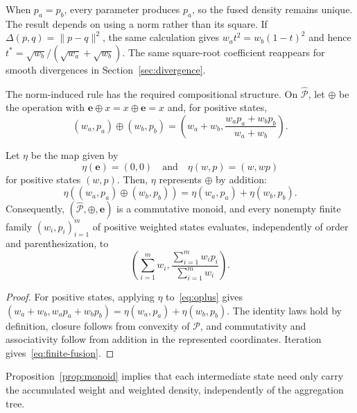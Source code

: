 \documentclass[runningheads]{llncs}
\newcommand{\Pcal}{\mathcal{P}}
\newcommand{\e}{\mathbf{e}}
\newcommand{\norm}[1]{\lVert #1\rVert}
\begin{document}
When $p_a=p_b$, every parameter produces $p_a$, so the fused density remains unique. The result depends on using a norm rather than its square. If $\Delta(p,q)=\norm{p-q}^2$, the same calculation gives $w_at^2=w_b(1-t)^2$ and hence $t^*=\sqrt{w_b}/(\sqrt{w_a}+\sqrt{w_b})$. %
The same square-root coefficient reappears for smooth divergences in
Section~\ref{sec:divergence}.

The norm-induced rule has the required compositional structure. On $\widehat{\Pcal}$, let $\oplus$ be the operation with $\e\oplus x=x\oplus\e=x$ and, for positive states,
\begin{equation}
  (w_a,p_a)\oplus(w_b,p_b) =
  \left(w_a+w_b,
  \frac{w_ap_a+w_bp_b}{w_a+w_b}
  \right).
  \label{eq:oplus}
\end{equation}

\begin{proposition}\label{prop:monoid}
Let $\eta$ be the map given by
\[\eta(\e)=(0,0)\quad\text{and}\quad \eta(w,p)=(w,wp)\]
for positive states $(w,p)$. Then, $\eta$ represents $\oplus$ by addition:
\begin{equation}
  \eta((w_a,p_a)\oplus(w_b,p_b))
  =
  \eta(w_a,p_a)+\eta(w_b,p_b).
  \label{eq:additive-representation}
\end{equation}
Consequently, $(\widehat{\Pcal},\oplus,\e)$ is a commutative monoid, and 
every nonempty finite family $(w_i,p_i)_{i=1}^m$ of positive weighted states
evaluates, independently of order and parenthesization, to
\begin{equation}
  \left(
  \sum_{i=1}^m w_i,
  \frac{\sum_{i=1}^m w_i p_i}{\sum_{i=1}^m w_i}
  \right).
  \label{eq:finite-fusion}
\end{equation}
\end{proposition}

\begin{proof}
For positive states, applying $\eta$ to~\eqref{eq:oplus} gives $(w_a+w_b,w_ap_a+w_bp_b)=\eta(w_a,p_a)+\eta(w_b,p_b)$. The identity laws hold by definition, closure follows from convexity of $\Pcal$, and commutativity and associativity follow from addition in the represented coordinates. Iteration gives~\eqref{eq:finite-fusion}.
\end{proof}

Proposition~\ref{prop:monoid} implies that each intermediate state need only carry the accumulated weight and weighted density, independently of the aggregation tree.
\end{document}
